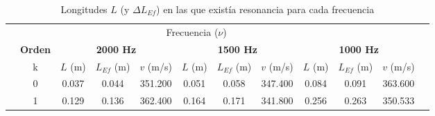 \begin{table*}
  \centering
  \caption{Longitudes $L$ (y $\Delta L_{Ef}$) en las que existía resonancia para cada frecuencia}
    \begin{tabular}{|c|ccc|c|cc|c|cc|c|c|}
\cline{1-11}    \rowcolor[rgb]{ .788,  .788,  .788} \multicolumn{2}{|c|}{} & \multicolumn{9}{c|}{Frecuencia ($\nu$)}                               & \multicolumn{1}{c}{\cellcolor[rgb]{ 1,  1,  1}} \bigstrut\\
\cline{2-11}    \rowcolor[rgb]{ .788,  .788,  .788}       & \multicolumn{1}{c|}{\cellcolor[rgb]{ .949,  .949,  .949}\textcolor[rgb]{ .247,  .247,  .247}{\textbf{Orden}}} & \multicolumn{3}{c|}{\cellcolor[rgb]{ .949,  .949,  .949}\textcolor[rgb]{ .247,  .247,  .247}{\textbf{2000  Hz}}} & \multicolumn{3}{c|}{\cellcolor[rgb]{ .949,  .949,  .949}\textcolor[rgb]{ .247,  .247,  .247}{\textbf{1500  Hz}}} & \multicolumn{3}{c|}{\cellcolor[rgb]{ .949,  .949,  .949}\textcolor[rgb]{ .247,  .247,  .247}{\textbf{1000 Hz}}} & \multicolumn{1}{c}{\cellcolor[rgb]{ 1,  1,  1}} \bigstrut\\
\cline{2-11}    \rowcolor[rgb]{ .788,  .788,  .788}       & \multicolumn{1}{c|}{\cellcolor[rgb]{ .929,  .929,  .929}k} & \multicolumn{1}{c|}{\cellcolor[rgb]{ .929,  .929,  .929}$L$ (m)} & \cellcolor[rgb]{ .929,  .929,  .929}$L_{Ef}$ (m) & \cellcolor[rgb]{ .929,  .929,  .929}$v$ (m/s) & \multicolumn{1}{c|}{\cellcolor[rgb]{ .929,  .929,  .929}$L$ (m)} & \cellcolor[rgb]{ .929,  .929,  .929}$L_{Ef}$ (m) & \cellcolor[rgb]{ .929,  .929,  .929}$v$ (m/s) & \multicolumn{1}{c|}{\cellcolor[rgb]{ .929,  .929,  .929}$L$ (m)} & \cellcolor[rgb]{ .929,  .929,  .929}$L_{Ef}$ (m) & \cellcolor[rgb]{ .929,  .929,  .929}$v$ (m/s) & \multicolumn{1}{c}{\cellcolor[rgb]{ 1,  1,  1}} \bigstrut\\
\cline{2-11}    \rowcolor[rgb]{ .788,  .788,  .788}       & \multicolumn{1}{c|}{\cellcolor[rgb]{ 1,  1,  1}0} & \multicolumn{1}{c|}{\cellcolor[rgb]{ 1,  1,  1}0.037} & \cellcolor[rgb]{ 1,  1,  1}0.044 & \cellcolor[rgb]{ 1,  1,  1}351.200 & \multicolumn{1}{c|}{\cellcolor[rgb]{ 1,  1,  1}0.051} & \cellcolor[rgb]{ 1,  1,  1}0.058 & \cellcolor[rgb]{ 1,  1,  1}347.400 & \multicolumn{1}{c|}{\cellcolor[rgb]{ 1,  1,  1}0.084} & \cellcolor[rgb]{ 1,  1,  1}0.091 & \cellcolor[rgb]{ 1,  1,  1}363.600 & \multicolumn{1}{c}{\cellcolor[rgb]{ 1,  1,  1}} \bigstrut\\
\cline{2-11}    \rowcolor[rgb]{ .788,  .788,  .788}       & \multicolumn{1}{c|}{\cellcolor[rgb]{ 1,  1,  1}1} & \multicolumn{1}{c|}{\cellcolor[rgb]{ 1,  1,  1}0.129} & \cellcolor[rgb]{ 1,  1,  1}0.136 & \cellcolor[rgb]{ 1,  1,  1}362.400 & \multicolumn{1}{c|}{\cellcolor[rgb]{ 1,  1,  1}0.164} & \cellcolor[rgb]{ 1,  1,  1}0.171 & \cellcolor[rgb]{ 1,  1,  1}341.800 & \multicolumn{1}{c|}{\cellcolor[rgb]{ 1,  1,  1}0.256} & \cellcolor[rgb]{ 1,  1,  1}0.263 & \cellcolor[rgb]{ 1,  1,  1}350.533 & \multicolumn{1}{c}{\cellcolor[rgb]{ 1,  1,  1}} \bigstrut\\

\end{tabular}
\end{table*}
